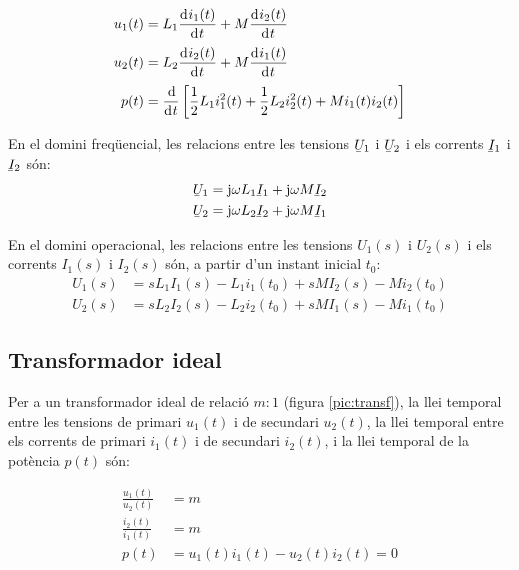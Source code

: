 \hfill
\begin{minipage}[b]{6.5cm}
	
	\label{pic:acobl}
\end{minipage}
\hfill
\begin{minipage}[b][3.8cm][t]{10cm}
	\begin{align}
		u_1(t) &= L_1 \deriv{i_1(t)}{t} + M \deriv{i_2(t)}{t} \\
		u_2(t) &= L_2 \deriv{i_2(t)}{t} + M \deriv{i_1(t)}{t} \\
		p(t) &= \frac{\diff}{\diff t} \left[ \frac{1}{2} L_1 i_1^2(t) + \frac{1}{2} L_2 i_2^2(t) +
		M i_1(t) i_2(t) \right]
	\end{align}
\end{minipage}


En el domini freqüencial, les relacions entre les tensions $\cmplx{U}_1$ i $\cmplx{U}_2$ i els corrents $\cmplx{I}_1$ i $\cmplx{I}_2$ són:
\begin{align}
	\cmplx{U}_1 &= \ju \omega L_1 \cmplx{I}_1 + \ju \omega M \cmplx{I}_2 \\
	\cmplx{U}_2 &= \ju \omega L_2 \cmplx{I}_2 + \ju \omega M \cmplx{I}_1
\end{align}

En el domini operacional, les relacions entre les tensions $U_1(s)$  i $U_2(s)$ i els corrents $I_1(s)$ i $I_2(s)$ són, a partir d'un instant inicial $t_0$:
\begin{align}
	U_1(s) &= s L_1 I_1(s) - L_1 i_1(t_0) + s M I_2(s) - M i_2(t_0) \\
	U_2(s) &= s L_2 I_2(s) - L_2 i_2(t_0) + s M I_1(s) - M i_1(t_0)
\end{align}

\subsection{Transformador ideal} 

Per a un transformador
ideal de relació $m\!:\!1$ (figura \vref{pic:transf}), la llei temporal
entre les tensions de primari $u_1(t)$ i de secundari $u_2(t)$, la
llei temporal entre els corrents de primari $i_1(t)$ i de secundari
$i_2(t)$, i la llei temporal de la potència $p(t)$ són:

\hfill
\begin{minipage}[b]{6.5cm}
	
	\label{pic:transf}
\end{minipage}
\hfill
\begin{minipage}[b][3.8cm][t]{10cm}
	\begin{align}
		\frac{u_1(t)}{u_2(t)} &= m  \\
		\frac{i_2(t)}{i_1(t)} &= m \\
		p(t) &= u_1(t) i_1(t) - u_2(t) i_2(t) = 0
	\end{align}
\end{minipage}


